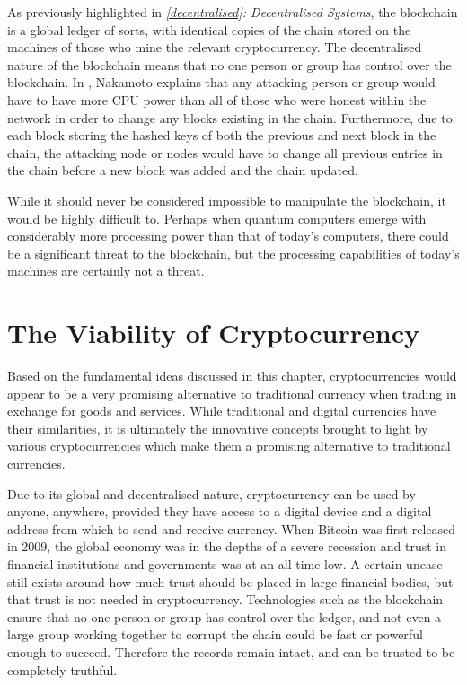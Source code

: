 As previously highlighted in \textit{\ref{decentralised}: Decentralised Systems}, the blockchain is a global ledger of sorts, with identical copies of the chain stored on the machines of those who mine the relevant cryptocurrency. The decentralised nature of the blockchain means that no one person or group has control over the blockchain. In \cite{snakamoto}, Nakamoto explains that any attacking person or group would have to have more CPU power than all of those who were honest within the network in order to change any blocks existing in the chain. Furthermore, due to each block storing the hashed keys of both the previous and next block in the chain, the attacking node or nodes would have to change all previous entries in the chain before a new block was added and the chain updated.

While it should never be considered impossible to manipulate the blockchain, it would be highly difficult to. Perhaps when quantum computers emerge with considerably more processing power than that of today's computers, there could be a significant threat to the blockchain, but the processing capabilities of today's machines are certainly not a threat. 

\section{The Viability of Cryptocurrency}
Based on the fundamental ideas discussed in this chapter, cryptocurrencies would appear to be a very promising alternative to traditional currency when trading in exchange for goods and services. While traditional and digital currencies have their similarities, it is ultimately the innovative concepts brought to light by various cryptocurrencies which make them a promising alternative to traditional currencies.

Due to its global and decentralised nature, cryptocurrency can be used by anyone, anywhere, provided they have access to a digital device and a digital address from which to send and receive currency. When Bitcoin was first released in 2009, the global economy was in the depths of a severe recession and trust in financial institutions and governments was at an all time low. A certain unease still exists around how much trust should be placed in large financial bodies, but that trust is not needed in cryptocurrency. Technologies such as the blockchain ensure that no one person or group has control over the ledger, and not even a large group working together to corrupt the chain could be fast or powerful enough to succeed. Therefore the records remain intact, and can be trusted to be completely truthful. 

